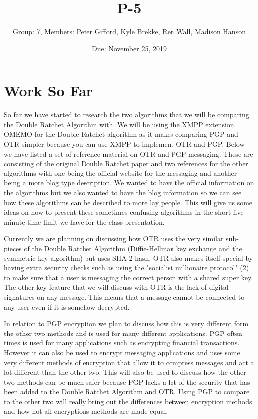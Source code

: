 \documentclass{article}
\title{P-5}
\author{Group: 7, Members: Peter Gifford, Kyle Brekke, Ren Wall, Madison Hanson}
\date{Due: November 25, 2019}
\begin{document}
\maketitle

\section{Work So Far}

So far we have started to research the two algorithms that we will be comparing the Double Ratchet Algorithm with. We will be using the XMPP extension OMEMO for the Double Ratchet algorithm as it makes comparing PGP and OTR simpler because you can use XMPP to implement OTR and PGP. Below we have listed a set of reference material on OTR and PGP messaging. These are consisting of the original Double Ratchet paper and two references for the other algorithms with one being the official website for the messaging and another being a more blog type description. We wanted to have the official information on the algorithms but we also wanted to have the blog information so we can see how these algorithms can be described to more lay people. This will give us some ideas on how to present these sometimes confusing algorithms in the short five minute time limit we have for the class presentation. \newline

Currently we are planning on discussing how OTR uses the very similar sub-pieces of the Double Ratchet Algorithm (Diffie-Hellman key exchange and  the symmetric-key algorithm)  but uses SHA-2 hash. OTR also makes itself special by having extra security checks such as using the "socialist millionaire protocol" (2) to make sure that a user is messaging the correct person with a shared super key. The other key feature that we will discuss with OTR is the lack of digital signatures on any message. This means that a message cannot be connected to any user even if it is somehow decrypted. \newline

In relation to PGP encryption we plan to discuss how this is very different form the other two methods and is used for many different applications. PGP often times is used for many applications such as encrypting financial transactions. However it can also be used to encrypt messaging applications and uses some very different methods of encryption that allow it to compress messages and act a lot different than the other two. This will also be used to discuss how the other two methods can be much safer because PGP lacks a lot of the security that has been added to the Double Ratchet Algorithm and OTR. Using PGP to compare to the other two will really bring out the differences between encryption methods and how not all encryptions methods are made equal.
\end{document}
